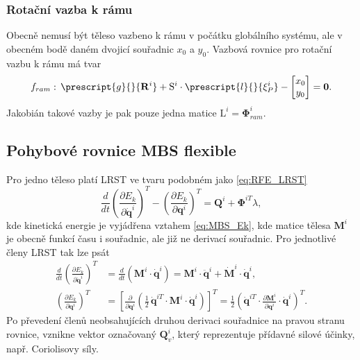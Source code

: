 \subsubsection{Rotační vazba k rámu}

Obecně nemusí být těleso vazbeno k rámu v počátku globálního systému, ale v obecném bodě daném dvojicí souřadnic $ x_0 $ a $ y_0 $. Vazbová rovnice pro rotační vazbu k rámu má tvar
\begin{equation}\label{eq:MBS_vazba frame}
	f_{ram}: \, \prescript{g}{}{\mathbf{R}^i} + \mathrm{S}^{i}\cdot \prescript{l}{}{\mathbf{\xi}^i_P} - 
	\begin{bmatrix}
		x_0 \\ 
		y_0
	\end{bmatrix} 
	= \mathbf{0}.
\end{equation}
Jakobián takové vazby je pak pouze jedna matice $ \mathrm{L}^i = \mathbf{\Phi}_{ram}^{i}$.


\subsection{Pohybové rovnice MBS flexible}
Pro jedno těleso platí LRST ve tvaru podobném jako \ref{eq:RFE_LRST}
\begin{equation}\label{eq:MBS_LRST}
	\frac{d}{dt} \left( \frac{\partial E_k}{\partial \mathbf{\dot{q}}^i} \right)^T  - \left( \frac{\partial E_k}{\partial {\mathbf{q}^i}}\right) ^T = \mathbf{Q}^i + \mathbf{\Phi}^{iT}\lambda,
\end{equation}
kde kinetická energie je vyjádřena vztahem \ref{eq:MBS_Ek}, kde matice tělesa $ \mathbf{M}^i $ je obecně funkcí času i souřadnic, ale již ne derivací souřadnic. Pro jednotlivé členy LRST tak lze psát
\begin{align}\label{eq:MBS_dEk dqt}
	\frac{d}{dt} \left( \frac{\partial E_k}{\partial \mathbf{\dot{q}}^i} \right)^T &= \frac{d}{dt} \left( \mathbf{M}^{i} \cdot \mathbf{\dot{q}}^i \right) = \mathbf{M}^{i} \cdot \mathbf{\ddot{q}}^i + \mathbf{\dot{M}}^{i} \cdot \mathbf{\dot{q}}^i ,\\
	\left( \frac{\partial E_k}{\partial {\mathbf{q}^i}}\right) ^T &= \left[ \frac{\partial}{\partial \mathbf{{q}}^i} \left( \frac{1}{2} \, \mathbf{\dot{q}}^{iT} \cdot \mathbf{M}^{i} \cdot \mathbf{\dot{q}}^i \right) \right]^T = \frac{1}{2} \left(  \mathbf{\dot{q}}^{iT} \cdot \frac{\partial \mathbf{M}^{i}}{\partial \mathbf{{q}}^i}  \cdot \mathbf{\dot{q}}^i \right)^T.
\end{align}
Po převedení členů neobsahujících druhou derivaci souřadnice na pravou stranu rovnice, vznikne vektor označovaný $ \mathbf{Q}_{v}^{i} $, který reprezentuje přídavné silové účinky, např. Coriolisovy síly.

